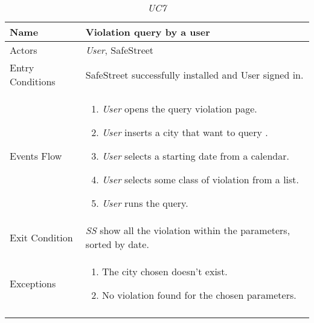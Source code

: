 \documentclass[../../../RASD.tex]{subfiles}
\begin{document}
    \begin{center}
        \begin{longtable}{| p{.35\linewidth} | p{.65\linewidth} |}
            \hline
            \textbf{Name} & \textbf{Violation query by a user}\\ \hline
            Actors & \textit{User}, SafeStreet\\ \hline
            Entry Conditions & SafeStreet successfully installed and User signed in.\\ \hline
            Events Flow &
            \begin{enumerate}
                \item \textit{User} opens the query violation page.
                \item \textit{User} inserts a city that want to query .
                \item \textit{User} selects a starting date from a calendar.
                \item \textit{User} selects some class of violation from a list.
                \item \textit{User} runs the query.
            \end{enumerate}
            \\ \hline
            Exit Condition & \textit{SS} show all the violation within the parameters, sorted by date.\\ \hline
            Exceptions &
            \begin{enumerate}
                \item The city chosen doesn’t exist.
                \item No violation found for the chosen parameters.
            \end{enumerate}
            \\
            \hline
            \caption{\textit{UC7}}
        \end{longtable}
    \end{center}
    \newpage
\end{document}
